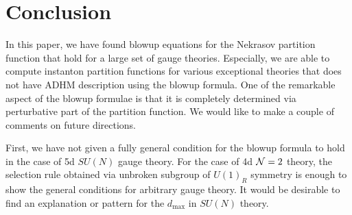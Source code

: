 \documentclass[letterpaper, 11pt]{article}
\def\CN{{\cal N}}
\begin{document}
{%




\section{Conclusion} \label{sec:conclusion}

In this paper, we have found blowup equations for the Nekrasov partition function that hold for a large set of gauge theories. Especially, we are able to compute instanton partition functions for various exceptional theories that does not have ADHM description using the blowup formula. One of the remarkable aspect of the blowup formulae is that it is completely determined via perturbative part of the partition function. We would like to make a couple of comments on future directions. 

First, we have not given a fully general condition for the blowup formula to hold in the case of 5d $SU(N)$ gauge theory. For the case of 4d $\CN=2$ theory, the selection rule obtained via unbroken subgroup of $U(1)_R$ symmetry is enough to show the general conditions for arbitrary gauge theory. It would be desirable to find an explanation or pattern for the $d_{\text{max}}$ in $SU(N)$ theory. 

}
\end{document}
